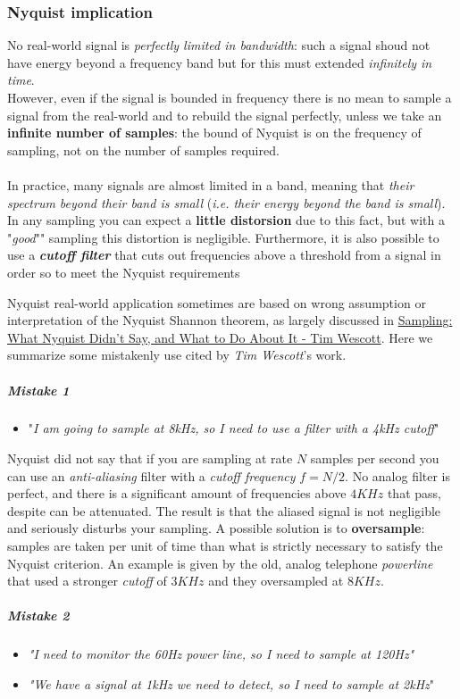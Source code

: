 \documentclass[10pt,a4paper]{report}
\theoremstyle{definition}
\begin{document}
\subsubsection{Nyquist implication}\label{sec:nyquist-implication}
No real-world signal is \textit{perfectly limited in bandwidth}: such a signal shoud not have energy beyond a frequency band but for this must extended \textit{infinitely in time}.\\
However, even if the signal is bounded in frequency there is no mean to sample a signal from the real-world and to rebuild the signal perfectly, unless we take an \textbf{infinite number of samples}: the bound of Nyquist is on the frequency of sampling, not on the number of samples required.\\\\
In practice, many signals are almost limited in a band, meaning that \textit{their spectrum beyond their band is small} (\textit{i.e. their energy beyond the band is small}).
In any sampling you can expect a \textbf{little distorsion} due to this fact,  but with a "\textit{good}"" sampling this distortion is negligible.
Furthermore, it is also possible to use a \textit{\textbf{cutoff filter}} that cuts out frequencies above a threshold from a signal in order so to meet the Nyquist requirements

Nyquist real-world application sometimes are based on wrong assumption or interpretation of the Nyquist Shannon theorem, as largely discussed in \href{https://neuron.eng.wayne.edu/auth/ece4330/practical_sampling.pdf}{Sampling: What Nyquist Didn’t Say, and What to Do About It -  Tim Wescott}.
Here we summarize some mistakenly use cited by \textit{Tim Wescott}'s work.
\subparagraph{Mistake 1}\label{sec:mistake-1}
\begin{itemize}
	\item "\textit{I am going to sample at 8kHz, so I need to use a filter with a 4kHz cutoff}"
\end{itemize}

Nyquist did not say that if you are sampling at rate $N$ samples per second you can use an \textit{anti-aliasing} filter with a \textit{cutoff frequency} $f=N/2$.
No analog filter is perfect, and there is a significant amount of frequencies above $4KHz$ that pass, despite can be attenuated.
The result is that the aliased signal is not negligible and seriously disturbs your sampling.
A possible solution is to \textbf{oversample}: samples are taken per unit of time than what is strictly necessary to satisfy the Nyquist criterion.
An example is given by the old, analog telephone \textit{powerline} that used a stronger \textit{cutoff} of $3KHz$ and they oversampled at $8 KHz$.
\subparagraph{Mistake 2}\label{sec:mistake-2}\begin{itemize}
	\item 
	\textit{"I need to monitor the 60Hz power line, so I need to sample at 120Hz"}
	\item 
	\textit{"We have a signal at 1kHz we need to detect, so I need to sample at 2kHz}"
\end{itemize}
\end{document}
